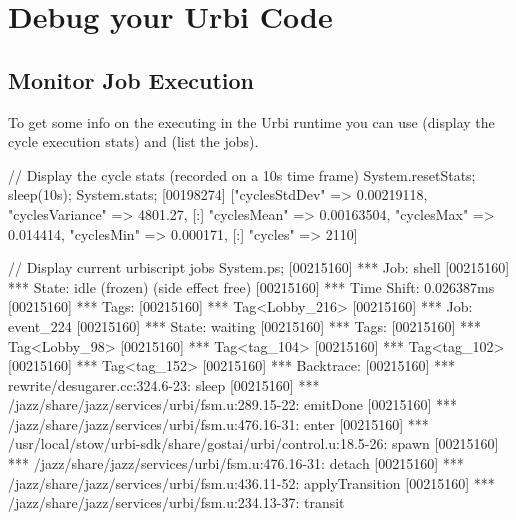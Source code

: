 
\section{Debug your Urbi Code}

\subsection{Monitor \us Job Execution}

To get some info on the \us executing in the Urbi runtime you can use
 (display the cycle execution stats) and
 (list the \us jobs).

\begin{urbiunchecked}
// Display the cycle stats (recorded on a 10s time frame)
System.resetStats;
sleep(10s);
System.stats;
[00198274] ["cyclesStdDev" => 0.00219118, "cyclesVariance" => 4801.27,
[:] "cyclesMean" => 0.00163504, "cyclesMax" => 0.014414, "cyclesMin" => 0.000171,
[:] "cycles" => 2110]

// Display current urbiscript jobs
System.ps;
[00215160] *** Job: shell
[00215160] ***   State: idle (frozen) (side effect free)
[00215160] ***   Time Shift: 0.026387ms
[00215160] ***   Tags:
[00215160] ***     Tag<Lobby_216>
[00215160] *** Job: event_224
[00215160] ***   State: waiting
[00215160] ***   Tags:
[00215160] ***     Tag<Lobby_98>
[00215160] ***     Tag<tag_104>
[00215160] ***     Tag<tag_102>
[00215160] ***     Tag<tag_152>
[00215160] ***   Backtrace:
[00215160] ***     rewrite/desugarer.cc:324.6-23: sleep
[00215160] ***     /jazz/share/jazz/services/urbi/fsm.u:289.15-22: emitDone
[00215160] ***     /jazz/share/jazz/services/urbi/fsm.u:476.16-31: enter
[00215160] ***     /usr/local/stow/urbi-sdk/share/gostai/urbi/control.u:18.5-26: spawn
[00215160] ***     /jazz/share/jazz/services/urbi/fsm.u:476.16-31: detach
[00215160] ***     /jazz/share/jazz/services/urbi/fsm.u:436.11-52: applyTransition
[00215160] ***     /jazz/share/jazz/services/urbi/fsm.u:234.13-37: transit
\end{urbiunchecked}

